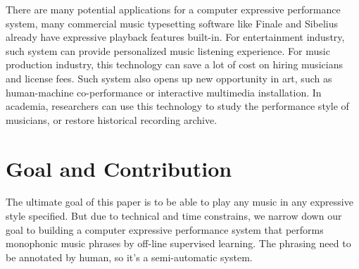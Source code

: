 
There are many potential applications for a computer expressive performance system, many commercial music typesetting software like Finale\cite{finale} and Sibelius\cite{sibelius} already have expressive playback features built-in. For entertainment industry, such system can provide personalized music listening experience. For music production industry, this technology can save a lot of cost on hiring musicians and license fees. Such system also opens up new opportunity in art, such as human-machine co-performance or interactive multimedia installation. In academia, researchers can use this technology to study the performance style of musicians, or restore historical recording archive.


%



\section{Goal and Contribution}
The ultimate goal of this paper is to be able to play any music in any expressive style specified. But due to technical and time constrains, we narrow down our goal to building a computer expressive performance system that performs monophonic music phrases by off-line supervised learning. The phrasing need to be annotated by human, so it's a semi-automatic system.



